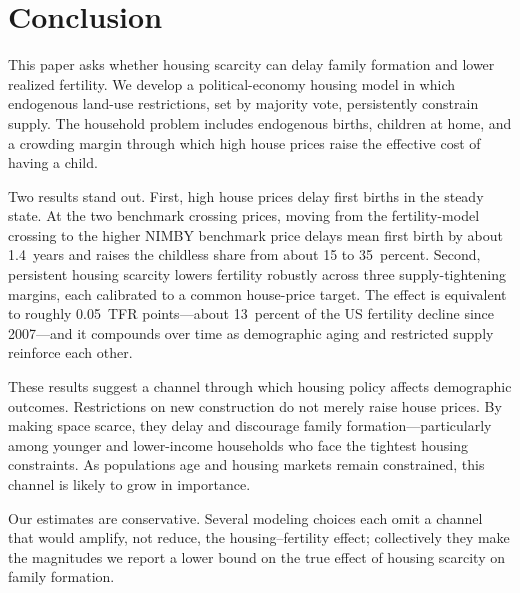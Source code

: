 \documentclass[11pt]{article}
\begin{document}
\section{Conclusion}

This paper asks whether housing scarcity can delay family formation and lower realized
fertility. We develop a political-economy housing model in which endogenous land-use
restrictions, set by majority vote, persistently constrain supply. The household problem
includes endogenous births, children at home, and a crowding margin through which high house
prices raise the effective cost of having a child.

Two results stand out. First, high house prices delay first births in the steady state. At
the two benchmark crossing prices, moving from the fertility-model crossing to the higher
NIMBY benchmark price delays mean first birth by about 1.4~years and raises the childless
share from about 15 to 35~percent. Second, persistent housing
scarcity lowers fertility robustly across three supply-tightening margins, each calibrated to
a common house-price target. The effect is equivalent to roughly 0.05~TFR points---about
13~percent of the US fertility decline since 2007---and it compounds over time as demographic
aging and restricted supply reinforce each other.

These results suggest a channel through which housing policy affects demographic outcomes.
Restrictions on new construction do not merely raise house prices. By making space scarce,
they delay and discourage family formation---particularly among younger and lower-income
households who face the tightest housing constraints. As populations age and housing markets
remain constrained, this channel is likely to grow in importance.

Our estimates are conservative. Several modeling choices each omit a channel that would
amplify, not reduce, the housing--fertility effect; collectively they make the magnitudes we
report a lower bound on the true effect of housing scarcity on family formation.
\end{document}

